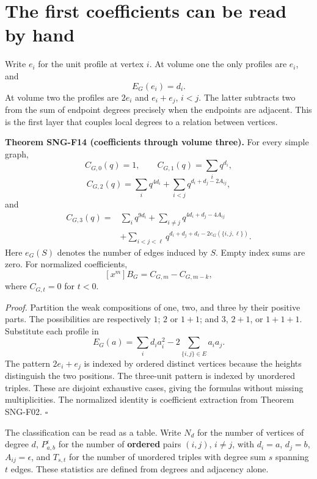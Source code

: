 \documentclass[
  11pt,
  a4paper,
]{report}
\begin{document}
\hypertarget{the-first-coefficients-can-be-read-by-hand}{%
\section{The first coefficients can be read by
hand}\label{the-first-coefficients-can-be-read-by-hand}}

Write \(e_i\) for the unit profile at vertex \(i\). At volume one the
only profiles are \(e_i\), and \[
E_G(e_i)=d_i.
\] At volume two the profiles are \(2e_i\) and \(e_i+e_j\), \(i<j\). The
latter subtracts two from the sum of endpoint degrees precisely when the
endpoints are adjacent. This is the first layer that couples local
degrees to a relation between vertices.

\textbf{Theorem SNG-F14 (coefficients through volume three).} For every
simple graph, \[
C_{G,0}(q)=1,
\qquad C_{G,1}(q)=\sum_iq^{d_i},
\] \[
C_{G,2}(q)=\sum_iq^{4d_i}
+\sum_{i<j}q^{d_i+d_j-2A_{ij}},
\] and \[
\begin{aligned}
C_{G,3}(q)={}&\sum_iq^{9d_i}
+\sum_{i\ne j}q^{4d_i+d_j-4A_{ij}}\\
&+\sum_{i<j<\ell}q^{d_i+d_j+d_\ell-2e_G(\{i,j,\ell\})}.
\end{aligned}
\] Here \(e_G(S)\) denotes the number of edges induced by \(S\). Empty
index sums are zero. For normalized coefficients, \[
[x^m]B_G=C_{G,m}-C_{G,m-k},
\] where \(C_{G,t}=0\) for \(t<0\).

\emph{Proof.} Partition the weak compositions of one, two, and three by
their positive parts. The possibilities are respectively \(1\); \(2\) or
\(1+1\); and \(3\), \(2+1\), or \(1+1+1\). Substitute each profile in \[
E_G(a)=\sum_i d_i a_i^2-2\sum_{\{i,j\}\in E}a_i a_j.
\] The pattern \(2e_i+e_j\) is indexed by ordered distinct vertices
because the heights distinguish the two positions. The three-unit
pattern is indexed by unordered triples. These are disjoint exhaustive
cases, giving the formulas without missing multiplicities. The
normalized identity is coefficient extraction from Theorem SNG-F02.
\(\square\)

The classification can be read as a table. Write \(N_d\) for the number
of vertices of degree \(d\), \(P_{a,b}^{\epsilon}\) for the number of
\textbf{ordered} pairs \((i,j)\), \(i\ne j\), with \(d_i=a\), \(d_j=b\),
\(A_{ij}=\epsilon\), and \(T_{s,t}\) for the number of unordered triples
with degree sum \(s\) spanning \(t\) edges. These statistics are defined
from degrees and adjacency alone.
\end{document}
